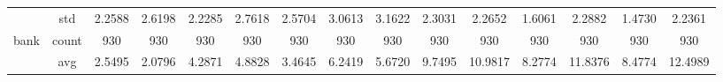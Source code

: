 \begin{table}[H]
{\begin{tabular}{rcccc|c|c|c|c|c|ccccc}
			                                                                               & std                                    & 2.2588                                                                             & 2.6198                                                                    & 2.2285                                                                    & 2.7618                                         & 2.5704                                                                    & 3.0613                                       & 3.1622                                      & 2.3031                                         & 2.2652                                         & 1.6061                                          & 2.2882                                          & 1.4730                                         & 2.2361                                         \\
			bank                                                                           & count                                  & 930                                                                                & 930                                                                       & 930                                                                       & 930                                            & 930                                                                       & 930                                          & 930                                         & 930                                            & 930                                            & 930                                             & 930                                             & 930                                            & 930                                            \\
			                                                                               & avg                                    & 2.5495                                                                             & \cellcolor[rgb]{ .776,  .937,  .808}\textcolor[rgb]{ 0,  .38,  0}{2.0796} & 4.2871                                                                    & 4.8828                                         & 3.4645                                                                    & 6.2419                                       & 5.6720                                      & 9.7495                                         & 10.9817                                        & 8.2774                                          & 11.8376                                         & 8.4774                                         & 12.4989                                        \\

\end{tabular}}
\end{table}

